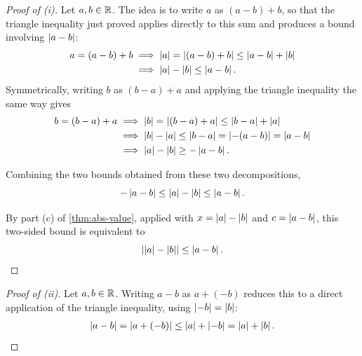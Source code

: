 \begin{proof}[Proof of (i)]
    Let $a, b \in \mathbb{R}$. The idea is to write $a$ as $(a-b)+b$, so that the
    triangle inequality just proved applies directly to this sum and produces
    a bound involving $\left|a-b\right|$:
    \begin{align*}
        a = (a - b) + b &\implies \left|a\right| = \left|(a - b) + b\right| \leq \left|a - b\right| + \left|b\right| \\
        &\implies \left|a\right| - \left|b\right| \leq \left|a - b\right|.
    \end{align*}
    Symmetrically, writing $b$ as $(b-a)+a$ and applying the triangle
    inequality the same way gives
    \begin{align*}
        b = (b - a) + a &\implies \left|b\right| = \left|(b - a) + a\right| \leq \left|b - a\right| + \left|a\right| \\
        &\implies \left|b\right| - \left|a\right| \leq \left|b-a\right|
            = \left|-(a-b)\right|=\left|a-b\right| \\
        &\implies \left|a\right| - \left|b\right| \geq - \left|a - b\right|.
    \end{align*}

    Combining the two bounds obtained from these two decompositions,
    \begin{equation*}
        -\left|a - b\right| \leq \left|a\right| - \left|b\right| \leq \left|a - b\right|.
    \end{equation*}

    By part (c) of \cref{thm:abs-value}, applied with $x=\left|a\right|-\left|b\right|$
    and $c=\left|a-b\right|$, this two-sided bound is equivalent to
    \begin{equation*}
        \left|\left|a\right| - \left|b\right|\right| \leq \left|a - b\right|.
    \end{equation*}
\end{proof}

\begin{proof}[Proof of (ii)]
    Let $a, b \in \mathbb{R}$. Writing $a-b$ as $a+(-b)$ reduces this to a direct
    application of the triangle inequality, using $\left|-b\right|=\left|b\right|$:
    \begin{align*}
        \left|a - b\right| = \left|a + \left(-b\right)\right| \leq \left|a\right| + \left|-b\right|
        = \left|a\right| + \left|b\right|.
    \end{align*}
\end{proof}

